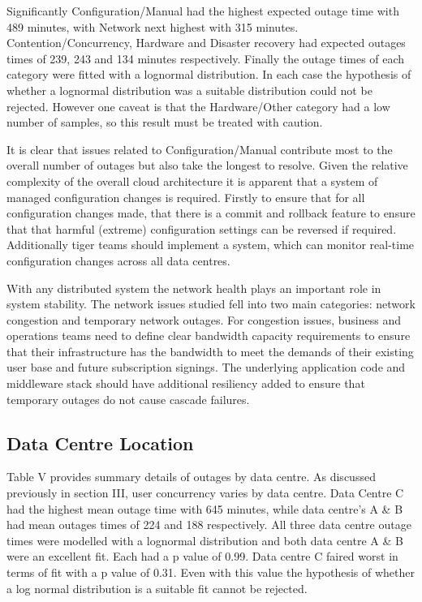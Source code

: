 \documentclass[conference]{IEEEtran}
\begin{document}
Significantly Configuration/Manual had the highest expected outage time with 489 minutes, with Network next highest with 315 minutes. Contention/Concurrency, Hardware and Disaster recovery had expected outages times of 239, 243 and 134 minutes respectively. Finally the outage times of each category were fitted with a lognormal distribution. In each case the hypothesis of whether a lognormal distribution was a suitable distribution could not be rejected. However one caveat is that the Hardware/Other category had a low number of samples, so this result must be treated with caution. \par

It is clear that issues related to Configuration/Manual contribute most to the overall number of outages but also take the longest to resolve.  Given the relative complexity of the overall cloud architecture it is apparent that a system of managed configuration changes is required. Firstly to ensure that for all configuration changes made, that there is a commit and rollback feature to ensure that that harmful (extreme) configuration settings can be reversed if required. Additionally tiger teams should implement a system, which can monitor real-time configuration changes across all data centres.  \par

With any distributed system the network health plays an important role in system stability. The network issues studied fell into two main categories: network congestion and temporary network outages. For congestion issues, business and operations teams need to define clear bandwidth capacity requirements to ensure that their infrastructure has the bandwidth to meet the demands of their existing user base and future subscription signings. The underlying application code and middleware stack should have additional resiliency added to ensure that temporary outages do not cause cascade failures.  \par

\subsection{Data Centre Location}

Table V provides summary details of outages by data centre. As discussed previously in section III, user concurrency varies by data centre. Data Centre C had the highest mean outage time with 645 minutes, while data centre's A \& B had mean outages times of 224 and 188 respectively. All three data centre outage times were modelled with a lognormal distribution and both data centre A \& B were an excellent fit. Each had a  p value of 0.99. Data centre C faired worst in terms of fit with a p value of 0.31. Even with this value the hypothesis of whether a log normal distribution is a suitable fit cannot be rejected. \par
\end{document}
